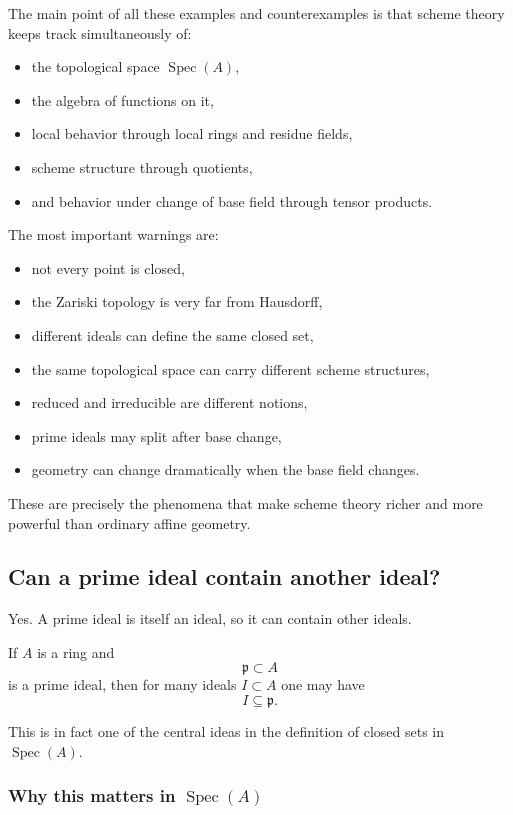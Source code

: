 \documentclass[12pt,a4paper]{article}
\theoremstyle{notespace}
\newcommand{\Spec}{\operatorname{Spec}}
\newcommand{\mf}{\mathfrak}
\theoremstyle{definition}
\begin{document}
The main point of all these examples and counterexamples is that scheme theory keeps track simultaneously of:

\begin{itemize}
	\item the topological space \(\Spec(A)\),
	\item the algebra of functions on it,
	\item local behavior through local rings and residue fields,
	\item scheme structure through quotients,
	\item and behavior under change of base field through tensor products.
\end{itemize}

The most important warnings are:

\begin{itemize}
	\item not every point is closed,
	\item the Zariski topology is very far from Hausdorff,
	\item different ideals can define the same closed set,
	\item the same topological space can carry different scheme structures,
	\item reduced and irreducible are different notions,
	\item prime ideals may split after base change,
	\item geometry can change dramatically when the base field changes.
\end{itemize}

These are precisely the phenomena that make scheme theory richer and more powerful than ordinary affine geometry.

\subsection{Can a prime ideal contain another ideal?}

Yes. A prime ideal is itself an ideal, so it can contain other ideals.

If \(A\) is a ring and
\[
\mf p \subset A
\]
is a prime ideal, then for many ideals \(I \subset A\) one may have
\[
I \subseteq \mf p.
\]

This is in fact one of the central ideas in the definition of closed sets in \(\Spec(A)\).

\subsubsection{Why this matters in \(\Spec(A)\)}
\end{document}
